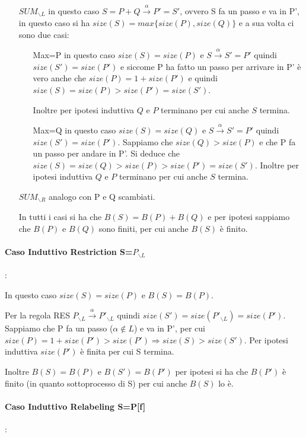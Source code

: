 \documentclass{article}
\newcommand{\pl}{P_{\backslash L}}
\newcommand{\pil}{P'_{\backslash L}}
\newcommand{\passo}{\xrightarrow{\alpha}}
\begin{document}
\begin{itemize}
    \item [$SUM_{\backslash L}$] in questo caso $S = P+Q \xrightarrow{\alpha} P' = S'$, ovvero S fa un passo e va in P', in questo caso si ha $size(S) = max\{size(P), size(Q)\}$ e a sua volta ci sono due casi:
    \begin{itemize}
        \item [Max=P] in questo caso $size(S) = size(P)$ e $S \passo S'=P'$ quindi $size(S')=size(P')$ e siccome P ha fatto un passo per arrivare in P' è vero anche che $size(P) = 1 + size(P')$ e quindi $size(S)=size(P)>size(P')=size(S')$. 
        
        Inoltre per ipotesi induttiva $Q$ e $P$ terminano per cui anche $S$ termina.
        
        \item[Max=Q] in questo caso $size(S) = size(Q)$ e  $S \passo S'=P'$ quindi $size(S')=size(P')$. Sappiamo che $size(Q)>size(P)$ e che P fa un passo per andare in P'. Si deduce che $size(S)=size(Q)>size(P)>size(P')=size(S')$.
        Inoltre per ipotesi induttiva $Q$ e $P$ terminano per cui anche $S$ termina.
        
    \end{itemize}
    
    \item [$SUM_{\backslash R} $] analogo con P e Q scambiati.
    
In tutti i casi si ha che $ B(S) =B(P) + B(Q) $ e per ipotesi sappiamo che $ B(P) $ e $ B(Q) $ sono finiti, per cui anche $ B(S) $ è finito.
\end{itemize}

\paragraph{Caso Induttivo Restriction S=$\pl$}:

In questo caso $size(S) = size(P)$ e $B(S)=B(P)$. 

Per la regola RES $\pl \passo \pil$ quindi $size(S')= size(\pil) =size(P')$. Sappiamo che P fa un passo ($\alpha \not\in L$) e va in P', per cui $size(P) = 1+ size(P')>size(P') \Rightarrow size(S)>size(S')$. Per ipotesi induttiva $size(P')$ è finita per cui S termina.

Inoltre $B(S) =B(P)$ e $B(S') =B(P')$ per ipotesi si ha che $B(P')$ è finito (in quanto sottoprocesso di S) per cui anche $B(S)$ lo è.

\paragraph{Caso Induttivo Relabeling S=P[f]}:
\end{document}
